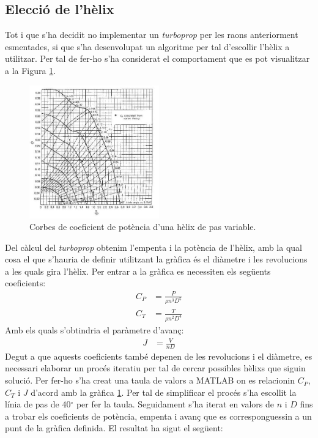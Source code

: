 \subsection{Elecció de l'hèlix}
Tot i que s'ha decidit no implementar un \textit{turboprop} per les raons anteriorment esmentades, si que s'ha desenvolupat un algoritme per tal d'escollir l'hèlix a utilitzar. Per tal de fer-ho s'ha considerat el comportament que es pot visualitzar a la Figura \ref{diag_helix}.
\begin{figure}[H]
	\centering
	\includegraphics[width=0.5\textwidth]{./pics/parametreshelix.JPG}
	\caption{Corbes de coeficient de potència d'una hèlix de pas variable.}
	\label{diag_helix}
\end{figure}
\noindent Del càlcul del \textit{turboprop} obtenim l'empenta i la potència de l'hèlix, amb la qual cosa el que s'hauria de definir utilitzant la gràfica és el diàmetre i les revolucions a les quals gira l'hèlix. Per entrar a la gràfica es necessiten els següents coeficients: 
\begin{align}
	C_{P} &= \frac{P}{\rho n^3 D^5} \\
	C_{T} &= \frac{T}{\rho n^2 D^4} 
	\end{align}
Amb els quals s'obtindria el paràmetre d'avanç: 
\begin{align}
	J &= \frac{V}{nD}  
	\end{align}
Degut a que aquests coeficients també depenen de les revolucions i el diàmetre, es necessari elaborar un procés iteratiu per tal de cercar possibles hèlixs que siguin solució. Per fer-ho s'ha creat una taula de valors a MATLAB on es relacionin $C_P$, $C_T$ i $J$ d'acord amb la gràfica \ref{diag_helix}. Per tal de simplificar el procés s'ha escollit la línia de pas de 40$^{\circ}$ per fer la taula. Seguidament s'ha iterat en valors de $n$ i $D$ fins a trobar els coeficients de potència, empenta i avanç que es corresponguessin a un punt de la gràfica definida. El resultat ha sigut el següent: 
